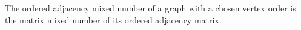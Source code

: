 The ordered adjacency mixed number of a graph with a chosen vertex order is
the matrix mixed number of its ordered adjacency matrix.
